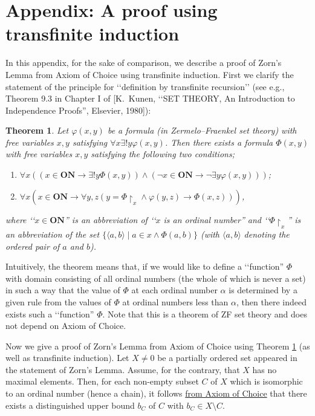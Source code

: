 \documentclass{article}
\newtheorem{theorem}{Theorem}
\begin{document}
\section*{Appendix: A proof using transfinite induction}

In this appendix, for the sake of comparison, we describe a proof of Zorn's Lemma from Axiom of Choice using transfinite induction.
First we clarify the statement of the principle for \lq\lq definition by transfinite recursion\rq\rq{} (see e.g., Theorem 9.3 in Chapter I of [K.~Kunen, \lq\lq SET THEORY, An Introduction to Independence Proofs'',  Elsevier, 1980]):
\begin{theorem}
\label{thm:transfinite_induction}
Let $\varphi(x,y)$ be a formula (in Zermelo--Fraenkel set theory) with free variables $x,y$ satisfying $\forall x \exists! y \varphi(x,y)$.
Then there exists a formula $\Phi(x,y)$ with free variables $x,y$ satisfying the following two conditions;
\begin{enumerate}
\item $\forall x ( (x \in \mathbf{ON} \to \exists! y \Phi(x,y)) \land (\neg x \in \mathbf{ON} \to \neg\exists y \varphi(x,y) ) )$;
\item $\forall x ( x \in \mathbf{ON} \to \forall y,z ( y = \Phi\!\upharpoonright_x \land \varphi(y,z) \to \Phi(x,z) ) )$,
\end{enumerate}
where \lq\lq $x \in \mathbf{ON}$'' is an abbreviation of \lq\lq $x$ is an ordinal number'' and \lq\lq $\Phi\!\upharpoonright_x$'' is an abbreviation of the set $\{\langle a,b \rangle \mid a \in x \land \Phi(a,b)\}$ (with $\langle a,b \rangle$ denoting the ordered pair of $a$ and $b$).
\end{theorem}
Intuitively, the theorem means that, if we would like to define a \lq\lq function'' $\Phi$ with domain consisting of all ordinal numbers (the whole of which is never a set) in such a way that the value of $\Phi$ at each ordinal number $\alpha$ is determined by a given rule from the values of $\Phi$ at ordinal numbers less than $\alpha$, then there indeed exists such a \lq\lq function'' $\Phi$.
Note that this is a theorem of ZF set theory and does not depend on Axiom of Choice.

Now we give a proof of Zorn's Lemma from Axiom of Choice using Theorem \ref{thm:transfinite_induction} (as well as transfinite induction).
Let $X \neq 0$ be a partially ordered set appeared in the statement of Zorn's Lemma.
Assume, for the contrary, that $X$ has no maximal elements.
Then, for each non-empty subset $C$ of $X$ which is isomorphic to an ordinal number (hence a chain), it follows \underline{from Axiom of Choice} that there exists a distinguished upper bound $b_C$ of $C$ with $b_C \in X \setminus C$.
\end{document}
